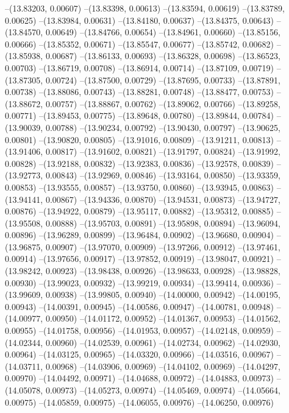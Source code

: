 --(13.83203, 0.00607)
--(13.83398, 0.00613)
--(13.83594, 0.00619)
--(13.83789, 0.00625)
--(13.83984, 0.00631)
--(13.84180, 0.00637)
--(13.84375, 0.00643)
--(13.84570, 0.00649)
--(13.84766, 0.00654)
--(13.84961, 0.00660)
--(13.85156, 0.00666)
--(13.85352, 0.00671)
--(13.85547, 0.00677)
--(13.85742, 0.00682)
--(13.85938, 0.00687)
--(13.86133, 0.00693)
--(13.86328, 0.00698)
--(13.86523, 0.00703)
--(13.86719, 0.00708)
--(13.86914, 0.00714)
--(13.87109, 0.00719)
--(13.87305, 0.00724)
--(13.87500, 0.00729)
--(13.87695, 0.00733)
--(13.87891, 0.00738)
--(13.88086, 0.00743)
--(13.88281, 0.00748)
--(13.88477, 0.00753)
--(13.88672, 0.00757)
--(13.88867, 0.00762)
--(13.89062, 0.00766)
--(13.89258, 0.00771)
--(13.89453, 0.00775)
--(13.89648, 0.00780)
--(13.89844, 0.00784)
--(13.90039, 0.00788)
--(13.90234, 0.00792)
--(13.90430, 0.00797)
--(13.90625, 0.00801)
--(13.90820, 0.00805)
--(13.91016, 0.00809)
--(13.91211, 0.00813)
--(13.91406, 0.00817)
--(13.91602, 0.00821)
--(13.91797, 0.00824)
--(13.91992, 0.00828)
--(13.92188, 0.00832)
--(13.92383, 0.00836)
--(13.92578, 0.00839)
--(13.92773, 0.00843)
--(13.92969, 0.00846)
--(13.93164, 0.00850)
--(13.93359, 0.00853)
--(13.93555, 0.00857)
--(13.93750, 0.00860)
--(13.93945, 0.00863)
--(13.94141, 0.00867)
--(13.94336, 0.00870)
--(13.94531, 0.00873)
--(13.94727, 0.00876)
--(13.94922, 0.00879)
--(13.95117, 0.00882)
--(13.95312, 0.00885)
--(13.95508, 0.00888)
--(13.95703, 0.00891)
--(13.95898, 0.00894)
--(13.96094, 0.00896)
--(13.96289, 0.00899)
--(13.96484, 0.00902)
--(13.96680, 0.00904)
--(13.96875, 0.00907)
--(13.97070, 0.00909)
--(13.97266, 0.00912)
--(13.97461, 0.00914)
--(13.97656, 0.00917)
--(13.97852, 0.00919)
--(13.98047, 0.00921)
--(13.98242, 0.00923)
--(13.98438, 0.00926)
--(13.98633, 0.00928)
--(13.98828, 0.00930)
--(13.99023, 0.00932)
--(13.99219, 0.00934)
--(13.99414, 0.00936)
--(13.99609, 0.00938)
--(13.99805, 0.00940)
--(14.00000, 0.00942)
--(14.00195, 0.00943)
--(14.00391, 0.00945)
--(14.00586, 0.00947)
--(14.00781, 0.00948)
--(14.00977, 0.00950)
--(14.01172, 0.00952)
--(14.01367, 0.00953)
--(14.01562, 0.00955)
--(14.01758, 0.00956)
--(14.01953, 0.00957)
--(14.02148, 0.00959)
--(14.02344, 0.00960)
--(14.02539, 0.00961)
--(14.02734, 0.00962)
--(14.02930, 0.00964)
--(14.03125, 0.00965)
--(14.03320, 0.00966)
--(14.03516, 0.00967)
--(14.03711, 0.00968)
--(14.03906, 0.00969)
--(14.04102, 0.00969)
--(14.04297, 0.00970)
--(14.04492, 0.00971)
--(14.04688, 0.00972)
--(14.04883, 0.00973)
--(14.05078, 0.00973)
--(14.05273, 0.00974)
--(14.05469, 0.00974)
--(14.05664, 0.00975)
--(14.05859, 0.00975)
--(14.06055, 0.00976)
--(14.06250, 0.00976)

